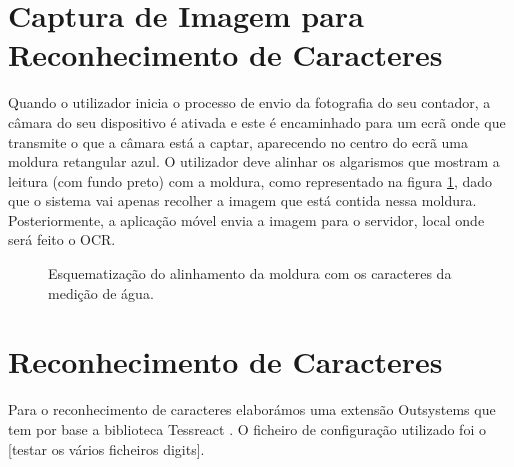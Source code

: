 \section{Captura de Imagem para Reconhecimento de Caracteres} \label{sec52}

Quando o utilizador inicia o processo de envio da fotografia do seu contador, a câmara do seu dispositivo é ativada e este é encaminhado para um ecrã onde que transmite o que a câmara está a captar, aparecendo no centro do ecrã uma moldura retangular azul. O utilizador deve alinhar os algarismos que mostram a leitura (com fundo preto) com a moldura, como representado na figura \ref{fig:moldura}, dado que o sistema vai apenas recolher a imagem que está contida nessa moldura.\\
Posteriormente, a aplicação móvel envia a imagem para o servidor, local onde será feito o OCR.

\begin{figure}[h!]
\begin{center}
\caption{Esquematização do alinhamento da moldura com os caracteres da medição de água.}
\label{fig:moldura}
\end{center}
\end{figure}

\section{Reconhecimento de Caracteres} \label{sec53}

Para o reconhecimento de caracteres elaborámos uma extensão Outsystems que tem por base a biblioteca Tessreact \cite{tesseract}. O ficheiro de configuração utilizado foi o [testar os vários ficheiros digits]. 



















